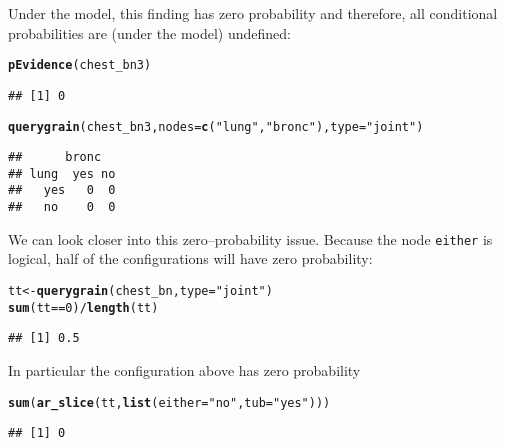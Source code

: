 \documentclass[10pt]{article}\usepackage[]{graphicx}\usepackage[]{color}
\makeatletter
\newcommand{\hlnum}[1]{\textcolor[rgb]{0.686,0.059,0.569}{#1}}%
\newcommand{\hlstr}[1]{\textcolor[rgb]{0.192,0.494,0.8}{#1}}%
\newcommand{\hlopt}[1]{\textcolor[rgb]{0,0,0}{#1}}%
\newcommand{\hlstd}[1]{\textcolor[rgb]{0.345,0.345,0.345}{#1}}%
\newcommand{\hlkwb}[1]{\textcolor[rgb]{0.69,0.353,0.396}{#1}}%
\newcommand{\hlkwc}[1]{\textcolor[rgb]{0.333,0.667,0.333}{#1}}%
\newcommand{\hlkwd}[1]{\textcolor[rgb]{0.737,0.353,0.396}{\textbf{#1}}}%
\newenvironment{kframe}{%
 \def\at@end@of@kframe{}%
 \ifinner\ifhmode%
  \def\at@end@of@kframe{\end{minipage}}%
  \begin{minipage}{\columnwidth}%
 \fi\fi%
 \def\FrameCommand##1{\hskip\@totalleftmargin \hskip-\fboxsep
 \colorbox{shadecolor}{##1}\hskip-\fboxsep
     \hskip-\linewidth \hskip-\@totalleftmargin \hskip\columnwidth}%
 \MakeFramed {\advance\hsize-\width
   \@totalleftmargin\z@ \linewidth\hsize
   \@setminipage}}%
 {\par\unskip\endMakeFramed%
 \at@end@of@kframe}
\newenvironment{knitrout}{}{} %
\def\code#1{{\texttt{#1}}}
\makeatother
\begin{document}
Under the model, this finding has zero probability and therefore, all
conditional probabilities are (under the model) undefined:

\begin{knitrout}
\color{fgcolor}\begin{kframe}
\begin{alltt}
\hlkwd{pEvidence}\hlstd{(chest_bn3)}
\end{alltt}
\begin{verbatim}
## [1] 0
\end{verbatim}
\begin{alltt}
\hlkwd{querygrain}\hlstd{(chest_bn3,} \hlkwc{nodes}\hlstd{=}\hlkwd{c}\hlstd{(}\hlstr{"lung"}\hlstd{,} \hlstr{"bronc"}\hlstd{),} \hlkwc{type}\hlstd{=}\hlstr{"joint"}\hlstd{)}
\end{alltt}
\begin{verbatim}
##      bronc
## lung  yes no
##   yes   0  0
##   no    0  0
\end{verbatim}
\end{kframe}
\end{knitrout}

We can look closer into this zero--probability issue. Because the node
\code{either} is logical, half of the configurations will have zero probability:

\begin{knitrout}
\color{fgcolor}\begin{kframe}
\begin{alltt}
\hlstd{tt} \hlkwb{<-} \hlkwd{querygrain}\hlstd{(chest_bn,} \hlkwc{type}\hlstd{=}\hlstr{"joint"}\hlstd{)}
\hlkwd{sum}\hlstd{(tt} \hlopt{==} \hlnum{0}\hlstd{)} \hlopt{/} \hlkwd{length}\hlstd{(tt)}
\end{alltt}
\begin{verbatim}
## [1] 0.5
\end{verbatim}
\end{kframe}
\end{knitrout}

In particular the configuration above has zero probability
\begin{knitrout}
\color{fgcolor}\begin{kframe}
\begin{alltt}
\hlkwd{sum}\hlstd{(}\hlkwd{ar_slice}\hlstd{(tt,} \hlkwd{list}\hlstd{(}\hlkwc{either}\hlstd{=}\hlstr{"no"}\hlstd{,} \hlkwc{tub}\hlstd{=}\hlstr{"yes"}\hlstd{)))}
\end{alltt}
\begin{verbatim}
## [1] 0
\end{verbatim}
\end{kframe}
\end{knitrout}
\end{document}
